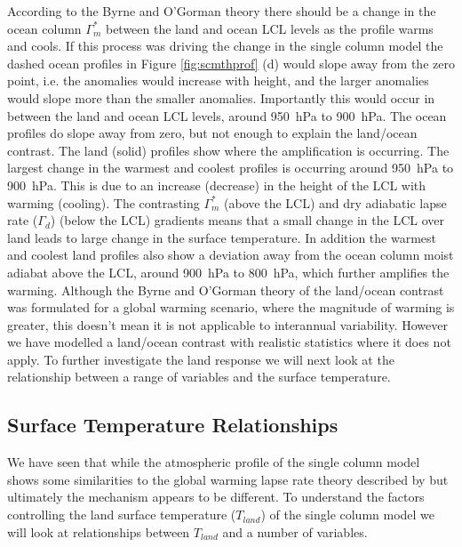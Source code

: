 According to the Byrne and O'Gorman theory there should be a change in the ocean 
column $\Gamma_m^*$ between the land and ocean LCL levels as the profile warms 
and cools. If this process was driving the change in the single column model the 
dashed ocean profiles in Figure \ref{fig:scmthprof} (d) would slope away from 
the zero point, i.e. the anomalies would increase with height, and the larger 
anomalies would slope more than the smaller anomalies. Importantly this would 
occur in between the land and ocean LCL levels, around \SI{950}{\hecto\pascal} 
to \SI{900}{\hecto\pascal}. The ocean profiles do slope away from zero, but not 
enough to explain the land/ocean contrast. The land (solid) profiles show where 
the amplification is occurring.  The largest change in the warmest and coolest 
profiles is occurring around \SI{950}{\hecto\pascal} to \SI{900}{\hecto\pascal}.  
This is due to an increase (decrease) in the height of the LCL with warming 
(cooling). The contrasting $\Gamma_m^*$ (above the LCL) and dry adiabatic lapse 
rate ($\Gamma_d$) (below the LCL) gradients means that a small change in the LCL 
over land leads to large change in the surface temperature. In addition the 
warmest and coolest land profiles also show a deviation away from the ocean 
column moist adiabat above the LCL, around \SI{900}{\hecto\pascal} to 
\SI{800}{\hecto\pascal}, which further amplifies the warming. Although the Byrne 
and O'Gorman theory of the land/ocean contrast was formulated for a global 
warming scenario, where the magnitude of warming is greater, this doesn't mean
it is not applicable to interannual variability. However we have modelled a 
land/ocean contrast with realistic statistics where it does not apply.
To further investigate the land response we will next look at the relationship 
between a range of variables and the surface temperature.



\subsection{Surface Temperature Relationships}

We have seen that while the atmospheric profile of the single column model shows 
some similarities to the global warming lapse rate theory described by 
\citet{Byrne2013a} but ultimately the mechanism appears to be different.  To 
understand the factors controlling the land surface temperature ($T_{land}$) of 
the single column model we will look at relationships between $T_{land}$ and a 
number of variables. 

